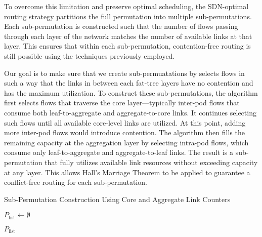 To overcome this limitation and preserve optimal scheduling, the SDN-optimal routing strategy partitions the full permutation into multiple sub-permutations. Each sub-permutation is constructed such that the number of flows passing through each layer of the network matches the number of available links at that layer. This ensures that within each sub-permutation, contention-free routing is still possible using the techniques previously employed.

Our goal is to make sure that we create sub-permuatations by selects flows in such a way that the links in between each fat-tree layers have no contention and has the maximum utilization. 
To construct these sub-permutations, the algorithm first selects flows that traverse the core layer—typically inter-pod flows that consume both leaf-to-aggregate and aggregate-to-core links. It continues selecting such flows until all available core-level links are utilized. At this point, adding more inter-pod flows would introduce contention. The algorithm then fills the remaining capacity at the aggregation layer by selecting intra-pod flows, which consume only leaf-to-aggregate and aggregate-to-leaf links. The result is a sub-permutation that fully utilizes available link resources without exceeding capacity at any layer. This allows Hall’s Marriage Theorem to be applied to guarantee a conflict-free routing for each sub-permutation.

\begin{algorithm}[H]
\caption{Sub-Permutation Construction Using Core and Aggregate Link Counters}
\label{alg:sub_permutation}

$P_{\text{list}} \gets \emptyset$\;


\Return $P_{\text{list}}$\;
\end{algorithm}


